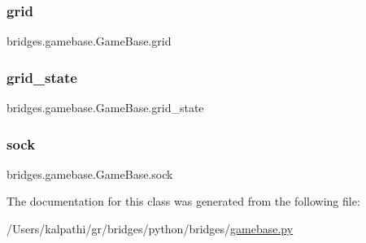 \subsubsection{\texorpdfstring{grid}{grid}}
{\footnotesize\ttfamily bridges.\+gamebase.\+Game\+Base.\+grid}

\mbox{\label{classbridges_1_1gamebase_1_1_game_base_ae397f4d601671d036d9c92902ba2d7f1}} 
\subsubsection{\texorpdfstring{grid\_state}{grid\_state}}
{\footnotesize\ttfamily bridges.\+gamebase.\+Game\+Base.\+grid\+\_\+state}

\mbox{\label{classbridges_1_1gamebase_1_1_game_base_a4a7fe2d524c02966900937bddea195e7}} 
\subsubsection{\texorpdfstring{sock}{sock}}
{\footnotesize\ttfamily bridges.\+gamebase.\+Game\+Base.\+sock}



The documentation for this class was generated from the following file\+:\begin{DoxyCompactItemize}
\item 
/\+Users/kalpathi/gr/bridges/python/bridges/\mbox{\hyperlink{gamebase_8py}{gamebase.\+py}}\end{DoxyCompactItemize}
